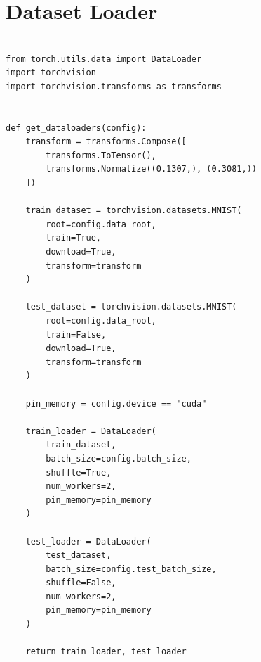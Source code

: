 \chapter{Dataset Loader}
\label{appendix:dataset_loader}

\begin{verbatim}

from torch.utils.data import DataLoader
import torchvision
import torchvision.transforms as transforms


def get_dataloaders(config):
    transform = transforms.Compose([
        transforms.ToTensor(),
        transforms.Normalize((0.1307,), (0.3081,))
    ])

    train_dataset = torchvision.datasets.MNIST(
        root=config.data_root,
        train=True,
        download=True,
        transform=transform
    )

    test_dataset = torchvision.datasets.MNIST(
        root=config.data_root,
        train=False,
        download=True,
        transform=transform
    )

    pin_memory = config.device == "cuda"

    train_loader = DataLoader(
        train_dataset,
        batch_size=config.batch_size,
        shuffle=True,
        num_workers=2,
        pin_memory=pin_memory
    )

    test_loader = DataLoader(
        test_dataset,
        batch_size=config.test_batch_size,
        shuffle=False,
        num_workers=2,
        pin_memory=pin_memory
    )

    return train_loader, test_loader

\end{verbatim}
